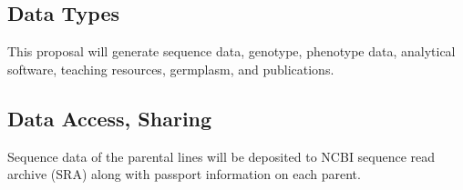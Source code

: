 \setcounter{page}{1}
\renewcommand{\thepage}{Data Management Plan - Page \arabic{page} of 1}

% 
% 
% 
% 
% 
% 

\subsection*{Data Types}

This proposal will generate sequence data, genotype, phenotype data, analytical software, teaching resources, germplasm, and publications.

\subsection*{Data Access, Sharing}

Sequence data of the parental lines will be deposited to NCBI sequence read archive (SRA) along with passport information on each parent. 

